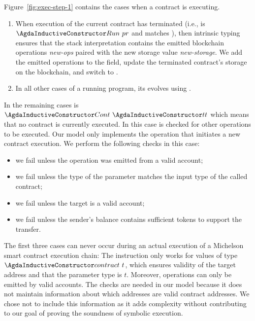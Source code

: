 Figure~\ref{fig:exec-step-1} contains the cases when a contract is executing.
\begin{enumerate}
\item When execution of the current contract has terminated
  (i.e.,  is $\ACon{Run}~pr$ and  matches ),
  then intrinsic typing ensures that  the stack interpretation
  contains the emitted blockchain operations \textit{new-ops}
  paired with the new storage value \textit{new-storage}.
  We add the emitted operations to the  field,
  update the terminated contract's storage on the blockchain, and
  switch to  . 
\item In all other cases of a running program, its  evolves using .
\end{enumerate}
In the remaining cases  is $\ACon{Cont}~\ACon{tt}$ which
means that no contract is currently executed. In this case
 is checked for other operations to be executed. 
Our model only implements the  operation
that initiates a new contract execution.
We perform the following checks in this case:
\begin{itemize}
\item we fail unless the operation was emitted from a valid account;
\item we fail unless the type of the parameter matches the input type of the called contract;
\item we fail unless the target is a valid account;
\item we fail unless the sender's balance
  contains sufficient tokens to support the transfer.
\end{itemize}
The first three cases can never occur during an actual execution of
a Michelson smart contract execution chain:
The  instruction only works for values of type
$\Acontract~t$, which ensures validity of the target address and that the
parameter type is $t$. Moreover, operations can only be emitted by valid accounts.
The checks are needed in our model because it does not maintain
information about which addresses are valid contract addresses.
We chose not to include this information as it adds complexity
without contributing to our goal of proving the soundness of symbolic
execution. 


